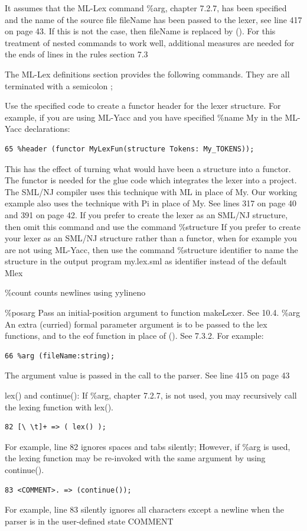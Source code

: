 \documentclass[8pt, a4paper, oneside, twocolumn]{extarticle}
\begin{document}
It assumes that the ML-Lex command \%arg, chapter 7.2.7, has
been specified and the name of the source file fileName has been passed to the lexer,
see line 417 on page 43. If this is not the case, then fileName is replaced by (). For
this treatment of nested commands to work well, additional measures are needed for the
ends of lines in the rules section 7.3


The ML-Lex definitions section provides the following commands. They are all terminated with a semicolon ;

Use the specified code to create a functor header for the lexer structure. For example, if
you are using ML-Yacc and you have specified \%name My in the ML-Yacc declarations:
\begin{verbatim}
65 %header (functor MyLexFun(structure Tokens: My_TOKENS));
\end{verbatim}
This has the effect of turning what would have been a structure into a functor. The
functor is needed for the glue code which integrates the lexer into a project.
The SML/NJ compiler uses this technique with ML in place of My. Our working
example also uses the technique with Pi in place of My. See lines 317 on page 40 and
391 on page 42.
If you prefer to create the lexer as an SML/NJ structure, then omit this command
and use the command \%structure
If you prefer to create your lexer as an SML/NJ structure rather than a functor, when
for example you are not using ML-Yacc, then use the command \%structure identifier
to name the structure in the output program my.lex.sml as identifier instead of the
default Mlex

\%count counts newlines using yylineno

\%posarg
Pass an initial-position argument to function makeLexer. See 10.4.
\%arg
An extra (curried) formal parameter argument is to be passed to the lex functions, and
to the eof function in place of (). See 7.3.2. For example:
\begin{verbatim}
66 %arg (fileName:string);
\end{verbatim}
The argument value is passed in the call to the parser. See line 415 on page 43 

lex() and continue():
If \%arg, chapter 7.2.7, is not used, you may recursively call the lexing function with
lex().
\begin{verbatim}
82 [\ \t]+ => ( lex() );
\end{verbatim}
For example, line 82 ignores spaces and tabs silently;
However, if \%arg is used, the lexing function may be re-invoked with the same argument by using continue().
\begin{verbatim}
83 <COMMENT>. => (continue());
\end{verbatim}
For example, line 83 silently ignores all characters except a newline when the parser is
in the user-defined state COMMENT
\end{document}
